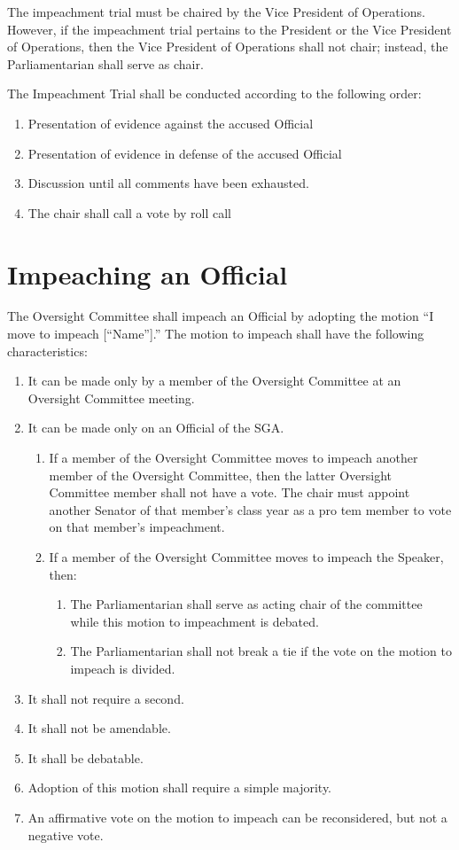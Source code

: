 \documentclass[12pt]{scrreprt}
\begin{document}
The impeachment trial must be chaired by the Vice President of Operations. However, if the impeachment
trial pertains to the President or the Vice President of Operations, then the Vice President of Operations
shall not chair; instead, the Parliamentarian shall serve as chair.

The Impeachment Trial shall be conducted according to the following order:
\begin{enumerate}
    \item Presentation of evidence against the accused Official
    \item Presentation of evidence in defense of the accused Official
    \item Discussion until all comments have been exhausted.
    \item The chair shall call a vote by roll call

\end{enumerate}

\section{Impeaching an Official}

The Oversight Committee shall impeach an Official by adopting the motion “I move to impeach
[“Name”].” The motion to impeach shall have the following characteristics: 
\begin{enumerate}
    \item It can be made only by a member of the Oversight Committee at an Oversight Committee
meeting.
    \item It can be made only on an Official of the SGA.
    \begin{enumerate}
        \item If a member of the Oversight Committee moves to impeach another member of the
Oversight Committee, then the latter Oversight Committee member shall not have a vote.
The chair must appoint another Senator of that member’s class year as a pro tem member
to vote on that member’s impeachment.
        \item If a member of the Oversight Committee moves to impeach the Speaker, then:
        \begin{enumerate}
            \item The Parliamentarian shall serve as acting chair of the committee while this
motion to impeachment is debated.
            \item The Parliamentarian shall not break a tie if the vote on the motion to impeach is divided.
        \end{enumerate}
    \end{enumerate}
    \item It shall not require a second.
    \item It shall not be amendable.
    \item It shall be debatable.
    \item Adoption of this motion shall require a simple majority.
    \item An affirmative vote on the motion to impeach can be reconsidered, but not a negative vote.
\end{enumerate}
\end{document}
